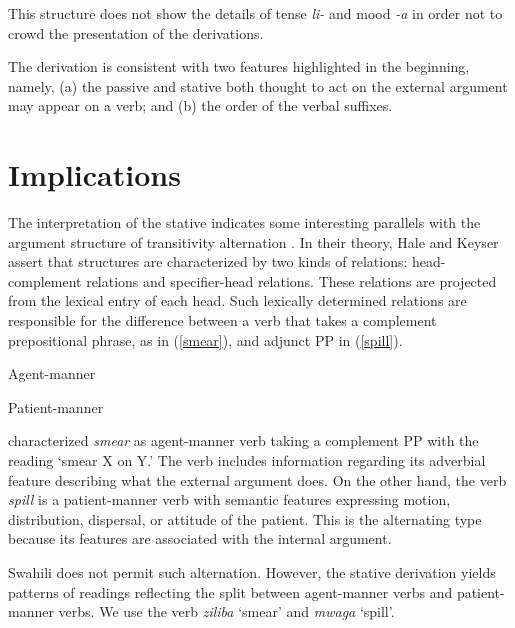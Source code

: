 \documentclass[output=paper]{langscibook}
\begin{document}
This structure does not show the details of tense \textit{li-} and mood \textit{-a} in order not to crowd the presentation of the derivations. 

The derivation is consistent with two features highlighted in the beginning, namely, (a) the passive and stative both thought to act on the external argument may appear on a verb; and (b) the order of the verbal suffixes.  

\section{Implications}
The interpretation of the stative indicates some interesting parallels with the argument structure of transitivity alternation \citep{Hale:2002aa}. In their theory, Hale and Keyser assert that structures are characterized by two kinds of relations: head-complement relations and specifier-head relations. These relations are projected from the lexical entry of each head. Such lexically determined relations are responsible for the difference between a verb that takes a complement prepositional phrase, as in (\ref{smear}), and adjunct PP in (\ref{spill}).\largerpage

\begin{exe}
\ex\label{smear}Agent-manner
\begin{xlist}
\end{xlist}
\ex\label{spill}Patient-manner
\begin{xlist}
\end{xlist}
\end{exe}
\citet{Hale:2002aa} characterized \textit{smear} as agent-manner verb taking a complement PP with the reading `smear X on Y.' The verb includes information regarding its adverbial feature describing what the external argument does. On the other hand, the verb \textit{spill} is a patient-manner verb with semantic features expressing motion, distribution, dispersal, or attitude of the patient. This is the alternating type because its features are associated with the internal argument. 

\begin{sloppypar}
Swahili does not permit such alternation. However, the stative derivation yields patterns of readings reflecting the split between agent-manner verbs and patient-manner verbs. We use the verb \textit{ziliba} `smear' and \textit{mwaga} `spill'. 
\end{sloppypar}
\end{document}
